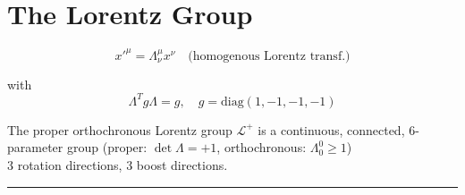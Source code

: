 \documentclass[11pt]{article}
\author{}%
\title{}
\date{} %
\newcommand{\lag}{\mathcal{L}}
\begin{document}
	\maketitle
	\vspace{-9em}

	\noindent
	
	\vspace{11pt}
	
	\section*{The Lorentz Group}
	
	\[ x'^{\mu} = \Lambda^\mu_\nu x^\nu \quad \text{(homogenous Lorentz transf.)}\]

with \[ \Lambda^T g \Lambda = g, \quad g = \text{diag}(1, -1, -1, -1)	\]
	
	The proper orthochronous Lorentz group $\lag^+$ is a continuous, connected, 6-parameter group  (proper: $\det \Lambda = + 1$, orthochronous: $\Lambda^0_0 \geq 1 $)\\
	
	3 rotation directions, 3 boost directions.\\ \vspace{-11pt}
	{\hfill \color{VioletRed} \rule{0.5\textwidth}{0.4pt} \hfill }\\
	
\end{document}
